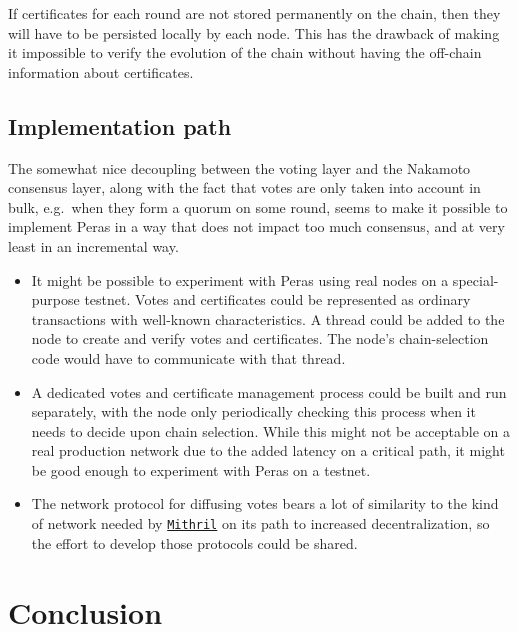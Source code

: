 \documentclass[10pt]{article}
\providecommand{\tightlist}{%
  \setlength{\itemsep}{0pt}\setlength{\parskip}{0pt}}
\begin{document}
If certificates for each round are not stored permanently on the chain,
then they will have to be persisted locally by each node. This has the
drawback of making it impossible to verify the evolution of the chain
without having the off-chain information about certificates.

\subsection{Implementation path}\label{implementation-path}

The somewhat nice decoupling between the voting layer and the Nakamoto
consensus layer, along with the fact that votes are only taken into
account in bulk, e.g.~when they form a quorum on some round, seems to
make it possible to implement Peras in a way that does not impact too
much consensus, and at very least in an incremental way.

\begin{itemize}
\tightlist
\item
  It might be possible to experiment with Peras using real nodes on a
  special-purpose testnet. Votes and certificates could be represented
  as ordinary transactions with well-known characteristics. A thread
  could be added to the node to create and verify votes and
  certificates. The node's chain-selection code would have to
  communicate with that thread.
\item
  A dedicated votes and certificate management process could be built
  and run separately, with the node only periodically checking this
  process when it needs to decide upon chain selection. While this might
  not be acceptable on a real production network due to the added
  latency on a critical path, it might be good enough to experiment with
  Peras on a testnet.
\item
  The network protocol for diffusing votes bears a lot of similarity to
  the kind of network needed by
  \href{https://hackmd.io/jwAdFPzZQj-llwfavl8Ahw}{\color{blue}\texttt{Mithril}} on its path
  to increased decentralization, so the effort to develop those
  protocols could be shared.
\end{itemize}

\newpage

\section{Conclusion}\label{conclusion-1}
\end{document}
